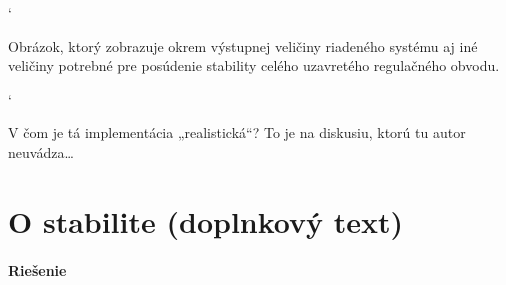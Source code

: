 \documentclass[a4paper, 10pt, ]{article}
\begin{document}
{\catcode`

}


\noindent
Obrázok, ktorý zobrazuje okrem výstupnej veličiny riadeného systému aj iné veličiny potrebné pre posúdenie stability celého uzavretého regulačného obvodu.

{\catcode`

}


\begin{centering}


    \vspace{-2mm}

    \figcaption{}

    \vspace{2mm}

    \label{figsc_ar02_f03_f01_0}

\end{centering}

\noindent
V čom je tá implementácia „realistická“? To je na diskusiu, ktorú tu autor neuvádza\ldots
























\section{O stabilite (doplnkový text)}


\paragraph{Riešenie}
\end{document}
